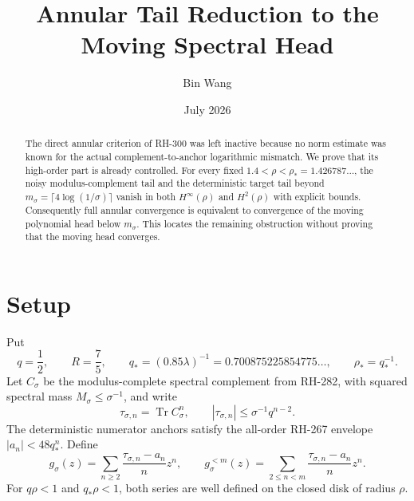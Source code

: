 \documentclass[11pt]{article}
\title{Annular Tail Reduction to the Moving Spectral Head}
\author{Bin Wang}\date{July 2026}
\theoremstyle{remark}\newtheorem{remark}[theorem]{Remark}
\newcommand{\Tr}{\operatorname{Tr}}
\begin{document}
\maketitle
\begin{abstract}
The direct annular criterion of RH-300 was left inactive because no norm
estimate was known for the actual complement-to-anchor logarithmic mismatch.
We prove that its high-order part is already controlled.  For every fixed
$1.4<\rho<\rho_*=1.426787\ldots$, the noisy modulus-complement tail and the
deterministic target tail beyond
$m_\sigma=\lceil4\log(1/\sigma)\rceil$ vanish in both $H^\infty(\rho)$ and
$H^2(\rho)$ with explicit bounds.  Consequently full annular convergence is
equivalent to convergence of the moving polynomial head below $m_\sigma$.
This locates the remaining obstruction without proving that the moving head
converges.
\end{abstract}

\section{Setup}
Put
\[
 q=\frac12,\qquad R=\frac75,\qquad
 q_*=(0.85\lambda)^{-1}=0.700875225854775\ldots,
 \qquad \rho_*=q_*^{-1}.
\]
Let $C_\sigma$ be the modulus-complete spectral complement from RH-282,
with squared spectral mass $M_\sigma\le\sigma^{-1}$, and write
\[
 \tau_{\sigma,n}=\Tr C_\sigma^n,
 \qquad |\tau_{\sigma,n}|\le\sigma^{-1}q^{n-2}.
\]
The deterministic numerator anchors satisfy the all-order RH-267 envelope
$|a_n|<48q_*^n$.  Define
\[
 g_\sigma(z)=\sum_{n\ge2}
 \frac{\tau_{\sigma,n}-a_n}{n}z^n,
 \qquad
 g_\sigma^{<m}(z)=\sum_{2\le n<m}
 \frac{\tau_{\sigma,n}-a_n}{n}z^n.
\]
For $q\rho<1$ and $q_*\rho<1$, both series are well defined on the closed
disk of radius $\rho$.
\end{document}
